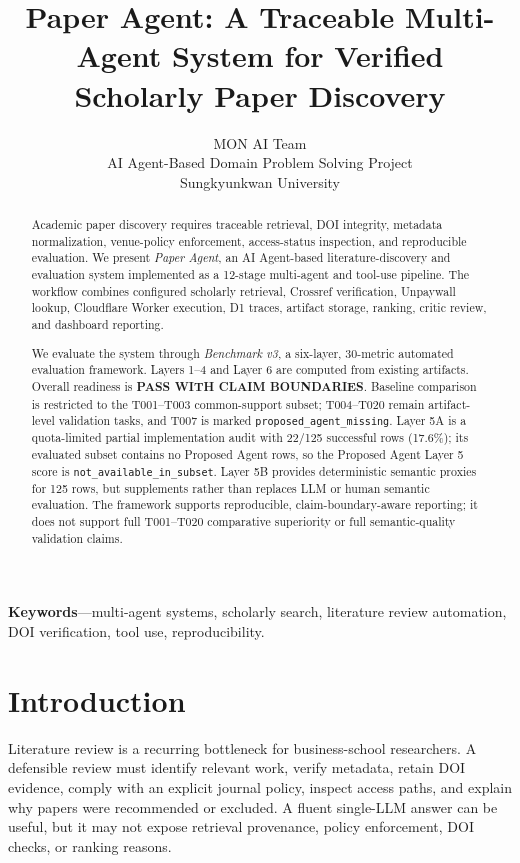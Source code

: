 \documentclass[10pt,twocolumn]{article}
\title{Paper Agent: A Traceable Multi-Agent System for Verified Scholarly Paper Discovery}
\author{MON AI Team\\AI Agent-Based Domain Problem Solving Project\\Sungkyunkwan University}
\date{}
\begin{document}
\maketitle

\begin{abstract}
Academic paper discovery requires traceable retrieval, DOI integrity, metadata normalization, venue-policy enforcement, access-status inspection, and reproducible evaluation. We present \textit{Paper Agent}, an AI Agent-based literature-discovery and evaluation system implemented as a 12-stage multi-agent and tool-use pipeline. The workflow combines configured scholarly retrieval, Crossref verification, Unpaywall lookup, Cloudflare Worker execution, D1 traces, artifact storage, ranking, critic review, and dashboard reporting.

We evaluate the system through \textit{Benchmark v3}, a six-layer, 30-metric automated evaluation framework. Layers 1--4 and Layer 6 are computed from existing artifacts. Overall readiness is \textbf{PASS WITH CLAIM BOUNDARIES}. Baseline comparison is restricted to the T001--T003 common-support subset; T004--T020 remain artifact-level validation tasks, and T007 is marked \texttt{proposed\_agent\_missing}. Layer 5A is a quota-limited partial implementation audit with 22/125 successful rows (17.6\%); its evaluated subset contains no Proposed Agent rows, so the Proposed Agent Layer 5 score is \texttt{not\_available\_in\_subset}. Layer 5B provides deterministic semantic proxies for 125 rows, but supplements rather than replaces LLM or human semantic evaluation. The framework supports reproducible, claim-boundary-aware reporting; it does not support full T001--T020 comparative superiority or full semantic-quality validation claims.

\end{abstract}

\noindent\textbf{Keywords}---multi-agent systems, scholarly search, literature review automation, DOI verification, tool use, reproducibility.

\section{Introduction}
Literature review is a recurring bottleneck for business-school researchers. A defensible review must identify relevant work, verify metadata, retain DOI evidence, comply with an explicit journal policy, inspect access paths, and explain why papers were recommended or excluded. A fluent single-LLM answer can be useful, but it may not expose retrieval provenance, policy enforcement, DOI checks, or ranking reasons.
\end{document}
